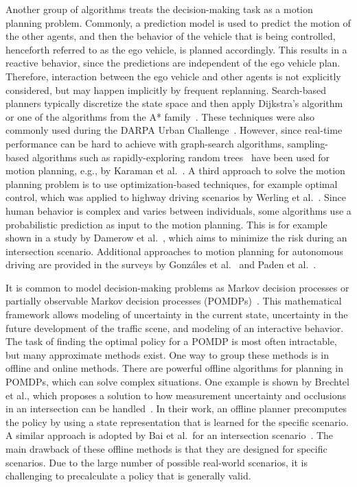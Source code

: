 Another group of algorithms treats the decision-making task as a motion planning problem. Commonly, a prediction model is used to predict the motion of the other agents, and then the behavior of the vehicle that is being controlled, henceforth referred to as the ego vehicle, is planned accordingly. This results in a reactive behavior, since the predictions are independent of the ego vehicle plan. Therefore, interaction between the ego vehicle and other agents is not explicitly considered, but may happen implicitly by frequent replanning.
Search-based planners typically discretize the state space and then apply Dijkstra's algorithm~\cite{Dijkstra1959} or one of the algorithms from the A* family~\cite{Hart1968}. These techniques were also commonly used during the DARPA Urban Challenge~\cite{Bacha2008, darpaStanford}. However, since real-time performance can be hard to achieve with graph-search algorithms, sampling-based algorithms such as rapidly-exploring random trees~\cite{Lavalle1998} have been used for motion planning, e.g., by Karaman et al.~\cite{Karaman2011}. 
A third approach to solve the motion planning problem is to use optimization-based techniques, for example optimal control, which was applied to highway driving scenarios by Werling et al.~\cite{Werling2010}. Since human behavior is complex and varies between individuals, some algorithms use a probabilistic prediction as input to the motion planning. This is for example shown in a study by Damerow et al.~\cite{Damerow2015}, which aims to minimize the risk during an intersection scenario.
Additional approaches to motion planning for autonomous driving are provided in the surveys by Gonzáles et al.~\cite{Gonzales2016} and Paden et al.~\cite{Paden2016}. 


It is common to model decision-making problems as Markov decision processes or partially observable Markov decision processes (POMDPs)~\cite{Kochenderfer2015}. This mathematical framework allows modeling of uncertainty in the current state, uncertainty in the future development of the traffic scene, and modeling of an interactive behavior. The task of finding the optimal policy for a POMDP is most often intractable, but many approximate methods exist. One way to group these methods is in offline and online methods. There are powerful offline algorithms for planning in POMDPs, which can solve complex situations. One example is shown by Brechtel et al., which proposes a solution to how measurement uncertainty and occlusions in an intersection can be handled~\cite{Brechtel2014}. In their work, an offline planner precomputes the policy by using a state representation that is learned for the specific scenario. A similar approach is adopted by Bai et al.\ for an intersection scenario~\cite{Bai2014}. The main drawback of these offline methods is that they are designed for specific scenarios. Due to the large number of possible real-world scenarios, it is challenging to precalculate a policy that is generally valid.


